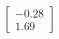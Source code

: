 \documentclass[preview]{standalone}
\begin{document}
\begin{align*}
\begin{bmatrix} -0.28 \\ 1.69 \end{bmatrix}
\end{align*}
\end{document}
